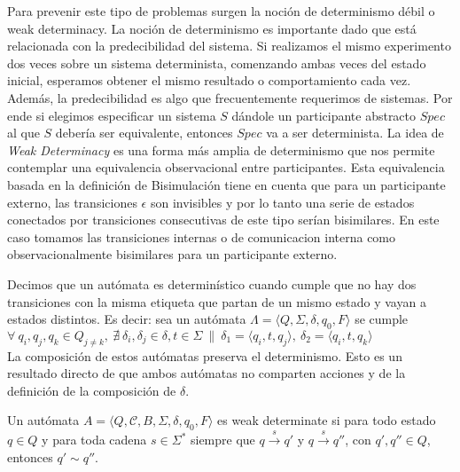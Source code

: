 Para prevenir este tipo de problemas surgen la noción de determinismo débil o weak determinacy. La noción de determinismo es importante dado que está relacionada con la predecibilidad del sistema. Si realizamos el mismo experimento dos veces sobre un sistema determinista, comenzando ambas veces del estado inicial, esperamos obtener el mismo resultado o comportamiento cada vez. Además, la predecibilidad es algo que frecuentemente requerimos de sistemas. Por ende si elegimos especificar un sistema $S$ dándole un participante abstracto $Spec$ al que $S$ debería ser equivalente, entonces $Spec$ va a ser determinista. La idea de \emph{Weak Determinacy} \cite[Def. 11.3]{comm} es una forma más amplia de determinismo que nos permite contemplar una equivalencia observacional entre participantes. Esta equivalencia basada en la definición de Bisimulación tiene en cuenta que para un participante externo, las transiciones $\epsilon$ son invisibles y por lo tanto una serie de estados conectados por transiciones consecutivas de este tipo serían bisimilares. En este caso tomamos las transiciones internas o de comunicacion interna como observacionalmente bisimilares para un participante externo.  

\begin{definition}[Determinismo] Decimos que un autómata es determinístico cuando cumple que no hay dos transiciones con la misma etiqueta que partan de un mismo estado y vayan a estados distintos. Es decir: 
sea un autómata $ \Lambda = \langle Q, \Sigma, \delta, q_0, F \rangle$ se cumple
$ \forall \  q_i, q_j, q_k \in Q_{j \neq k}, \  \nexists \ \delta_i, \delta_j \in \delta, t \in \Sigma \ \| \  \delta_1 = \langle q_i, t, q_j \rangle, \ \delta_2 = \langle q_i, t, q_k \rangle$ \\

La composición de estos autómatas preserva el determinismo. Esto es un resultado directo de que ambos autómatas no comparten acciones y de la definición de la composición de $\delta$.\end{definition}

\begin{definition} \cite{comm} Un autómata $A= \langle Q, \mathcal{C}, B, \Sigma, \delta, q_0, F \rangle$ es weak determinate si para todo estado $q \in Q$ y para toda cadena $s \in \Sigma^*$ siempre que $q \xrightarrow{s} q'$ y $q \xrightarrow{s} q''$, con $q',q'' \in Q$, entonces $q' \sim q''$.
\end{definition}


